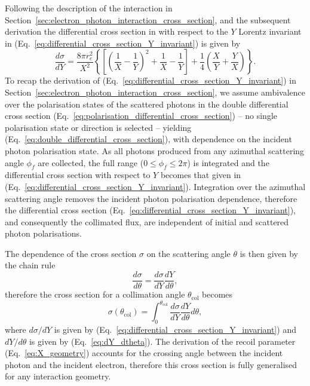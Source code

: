 \documentclass[../main.tex]{subfiles}
\begin{document}
Following the description of the interaction in Section~\ref{sec:electron_photon_interaction_cross_section}, and the subsequent derivation the differential cross section in with respect to the $Y$ Lorentz invariant in (Eq.~\ref{eq:differential_cross_section_Y_invariant}) is given by 
\begin{equation*}
\frac{d\sigma}{dY} = \frac{8\pi r_{e}^{2}}{X^{2}}\left\{\left[\left(\frac{1}{X}-\frac{1}{Y}\right)^{2}+\frac{1}{X}-\frac{1}{Y}\right]+\frac{1}{4}\left(\frac{X}{Y}+\frac{Y}{X}\right)\right\}.
\end{equation*}
To recap the derivation of (Eq.~\ref{eq:differential_cross_section_Y_invariant}) in Section~\ref{sec:electron_photon_interaction_cross_section}, we assume ambivalence over the polarisation states of the scattered photons in the double differential cross section (Eq.~\ref{eq:polarisation_differential_cross_section}) -- no single polarisation state or direction is selected -- yielding (Eq.~\ref{eq:double_differential_cross_section}), with dependence on the incident photon polarisation state. As all photons produced from any azimuthal scattering angle $\phi_{f}$ are collected, the full range ($0 \leq \phi_{f} \leq 2\pi$) is integrated and the differential cross section with respect to $Y$ becomes that given in (Eq.~\ref{eq:differential_cross_section_Y_invariant}). Integration over the azimuthal scattering angle removes the incident photon polarisation dependence, therefore the differential cross section (Eq.~\ref{eq:differential_cross_section_Y_invariant}), and consequently the collimated flux, are independent of initial and scattered photon polarisations.

The dependence of the cross section $\sigma$ on the scattering angle $\theta$ is then given by the chain rule
\begin{equation}
\frac{d\sigma}{d\theta} = \frac{d\sigma}{dY}\frac{dY}{d\theta},
\label{eq:cross_section_chain_rule}
\end{equation}
therefore the cross section for a collimation angle $\theta_{\mathrm{col}}$ becomes
\begin{equation}
\sigma\left(\theta_{\mathrm{col}}\right) = \int_{0}^{\theta_{\mathrm{col}}}\frac{d\sigma}{dY}\frac{dY}{d\theta}d\theta,
\label{eq:cross_section_integral}
\end{equation} 
where $d\sigma/dY$ is given by (Eq.~\ref{eq:differential_cross_section_Y_invariant}) and $dY/d\theta$ is given by (Eq.~\ref{eq:dY_dtheta}). The derivation of the recoil parameter (Eq.~\ref{eq:X_geometry}) accounts for the crossing angle between the incident photon and the incident electron, therefore this cross section is fully generalised for any interaction geometry.
\end{document}
